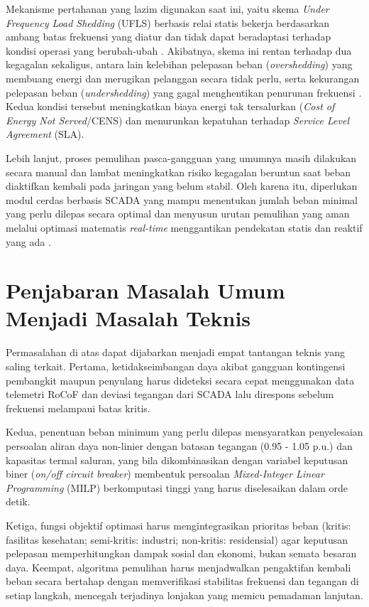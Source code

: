 Mekanisme pertahanan yang lazim digunakan saat ini, yaitu skema \textit{Under Frequency Load Shedding} (UFLS) berbasis relai statis bekerja berdasarkan ambang batas frekuensi yang diatur dan tidak dapat beradaptasi terhadap kondisi operasi yang berubah-ubah \cite{Elsaadany2025}. Akibatnya, skema ini rentan terhadap dua kegagalan sekaligus, antara lain kelebihan pelepasan beban (\textit{overshedding}) yang membuang energi dan merugikan pelanggan secara tidak perlu, serta kekurangan pelepasan beban (\textit{undershedding}) yang gagal menghentikan penurunan frekuensi \cite{Arani2021}. Kedua kondisi tersebut meningkatkan biaya energi tak tersalurkan (\textit{Cost of Energy Not Served}/CENS) dan menurunkan kepatuhan terhadap \textit{Service Level Agreement} (SLA).

Lebih lanjut, proses pemulihan pasca-gangguan yang umumnya masih dilakukan secara manual dan lambat meningkatkan risiko kegagalan beruntun saat beban diaktifkan kembali pada jaringan yang belum stabil. Oleh karena itu, diperlukan modul cerdas berbasis SCADA yang mampu menentukan jumlah beban minimal yang perlu dilepas secara optimal dan menyusun urutan pemulihan yang aman melalui optimasi matematis \textit{real-time} menggantikan pendekatan statis dan reaktif yang ada \cite{Mohan2020}.

\section{Penjabaran Masalah Umum Menjadi Masalah Teknis}
\label{sec:Penjabaran_Masalah_Umum_Menjadi_Masalah_Teknis}

Permasalahan di atas dapat dijabarkan menjadi empat tantangan teknis yang saling terkait. Pertama, ketidakseimbangan daya akibat gangguan kontingensi pembangkit maupun penyulang harus dideteksi secara cepat menggunakan data telemetri RoCoF dan deviasi tegangan dari SCADA lalu direspons sebelum frekuensi melampaui batas kritis. 

Kedua, penentuan beban minimum yang perlu dilepas mensyaratkan penyelesaian persoalan aliran daya non-linier dengan batasan tegangan (0.95 - 1.05 p.u.) dan kapasitas termal saluran, yang bila dikombinasikan dengan variabel keputusan biner (\textit{on/off circuit breaker}) membentuk persoalan \textit{Mixed-Integer Linear Programming} (MILP) berkomputasi tinggi yang harus diselesaikan dalam orde detik.

Ketiga, fungsi objektif optimasi harus mengintegrasikan prioritas beban (kritis: fasilitas kesehatan; semi-kritis: industri; non-kritis: residensial) agar keputusan pelepasan memperhitungkan dampak sosial dan ekonomi, bukan semata besaran daya. Keempat, algoritma pemulihan harus menjadwalkan pengaktifan kembali beban secara bertahap dengan memverifikasi stabilitas frekuensi dan tegangan di setiap langkah, mencegah terjadinya lonjakan yang memicu pemadaman lanjutan.

